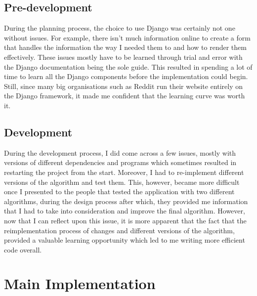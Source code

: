\subsection{Pre-development}
During the planning process, the choice to use Django was certainly not one without issues. For example, there isn't much information online to create a form that handles the information the way I needed them to and how to render them effectively. These issues mostly have to be learned through trial and error with the Django documentation being the sole guide. This resulted in spending a lot of time to learn all the Django components before the implementation could begin. Still, since many big organisations such as Reddit run their website entirely on the Django framework, it made me confident that the learning curve was worth it.

\subsection{Development}
During the development process, I did come across a few issues, mostly with versions of different dependencies and programs which sometimes resulted in restarting the project from the start. Moreover, I had to re-implement different versions of the algorithm and test them. This, however, became more difficult once I presented to the people that tested the application with two different algorithms, during the design process after which, they provided me information that I had to take into consideration and improve the final algorithm. However, now that I can reflect upon this issue, it is more apparent that the fact that the reimplementation process of changes and different versions of the algorithm, provided a valuable learning opportunity which led to me writing more efficient code overall.

\section{Main Implementation}

